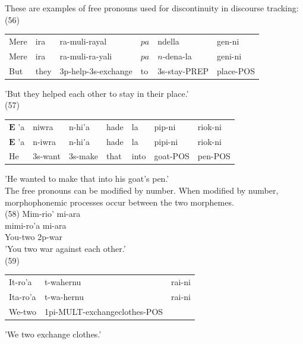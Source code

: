 \documentclass[10pt]{article}
\begin{document}
These are examples of free pronouns used for discontinuity in discourse tracking:\\
(56)

\begin{center}
\begin{tabular}{llllll}
Mere & ira & ra-muli-rayal & \(p a\) & ndella & gen-ni \\
Mere & ira & ra-muli-ra-yali & \(p a\) & \(n\)-dena-la & geni-ni \\
But & they & 3p-help-3s-exchange & to & 3s-stay-PREP & place-POS \\
\end{tabular}
\end{center}

'But they helped each other to stay in their place.'\\
(57)

\begin{center}
\begin{tabular}{lllllll}
\(\boldsymbol{E}\) 'a & niwra & n-hi'a & hade & la & pip-ni & riok-ni \\
\(\boldsymbol{E}\) 'a & n-iwra & n-hi'a & hade & la & pipi-ni & riok-ni \\
He & 3s-want & 3s-make & that & into & goat-POS & pen-POS \\
\end{tabular}
\end{center}

'He wanted to make that into his goat's pen.'\\
The free pronouns can be modified by number. When modified by number, morphophonemic processes occur between the two morphemes.\\
(58) Mim-rio' mi-ara\\
mimi-ro'a mi-ara\\
You-two 2p-war\\
'You two war against each other.'\\
(59)

\begin{center}
\begin{tabular}{llc}
It-ro'a & t-wahernu & rai-ni \\
Ita-ro'a & t-wa-hernu & rai-ni \\
We-two & 1pi-MULT-exchangeclothes-POS &  \\
\end{tabular}
\end{center}

'We two exchange clothes.'
\end{document}
